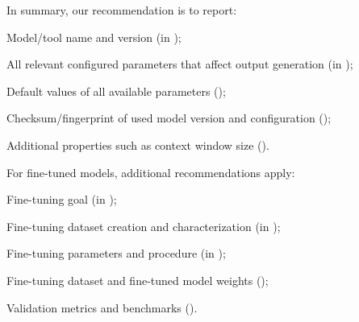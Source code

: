 In summary, our recommendation is to report:

\begin{enumerate*}[label=(\arabic*)]
\item Model/tool name and version (\must in \paper);
\item All relevant configured parameters that affect output generation (\must in \paper);
\item Default values of all available parameters (\should);
\item Checksum/fingerprint of used model version and configuration (\may);
\item Additional properties such as context window size (\may).
\end{enumerate*}

For fine-tuned models, additional recommendations apply:

\begin{enumerate*}[label=(\arabic*)]
\item Fine-tuning goal (\must in \paper);
\item Fine-tuning dataset creation and characterization (\must in \paper);
\item Fine-tuning parameters and procedure (\must in \paper);
\item Fine-tuning dataset and fine-tuned model weights (\should);
\item Validation metrics and benchmarks (\should).
\end{enumerate*}

